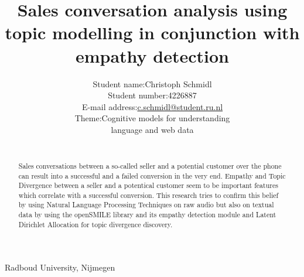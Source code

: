 \documentclass[twoside]{article}
\title{\vspace{-15mm}%
	\fontsize{24pt}{10pt}\selectfont
	\textbf{Sales conversation analysis using topic modelling in conjunction with empathy detection}\\
	}
\author{%
		 \begin{tabular}{rl}
  Student name:& Christoph Schmidl\\ 
  Student number:& 4226887 \\ 
  E-mail address:& \href{mailto:c.schmidl@student.ru.nl}{c.schmidl@student.ru.nl}\\
  Theme:& Cognitive models for understanding  \\ &language and web data\\
 \end{tabular}\\
	}
\date{}
\begin{document}
\maketitle
\thispagestyle{fancy}

  \begin{center}
  	Radboud University, Nijmegen  
  \end{center}  
  \vspace{2.5mm}

\begin{abstract}

\noindent Sales conversations between a so-called seller and a potential customer over the phone can result into a successful and a failed conversion in the very end. Empathy and Topic Divergence between a seller and a potentical customer seem to be important features which correlate with a successful conversion. This research tries to confirm this belief by using Natural Language Processing Techniques on raw audio but also on textual data by using the openSMILE library and its empathy detection module and Latent Dirichlet Allocation for topic divergence discovery.
\end{abstract}
\end{document}
